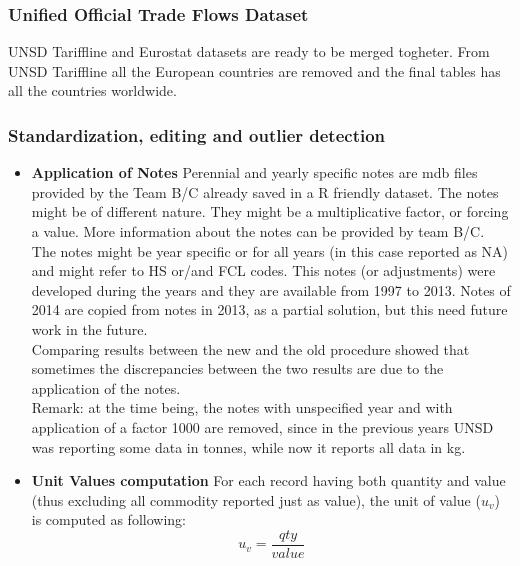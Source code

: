 \documentclass[nojss]{jss}\usepackage[]{graphicx}\usepackage[]{color}
\begin{document}
\subsubsection{Unified Official Trade Flows Dataset}
UNSD Tariffline and Eurostat datasets are ready to be merged togheter. From UNSD Tariffline all the European countries are removed and the final tables has all the countries worldwide.

\subsubsection{Standardization, editing and outlier detection}
\begin{itemize}
\item {\bf Application of Notes} Perennial and yearly specific notes are mdb files provided by the Team B/C already saved in a R friendly dataset. The notes might be of different nature. They might be a multiplicative factor, or forcing a value. More information  about the notes can be provided by team B/C. The notes might be year specific or for all years (in this case reported as NA) and might refer to HS or/and FCL codes. This notes (or adjustments) were developed during the years and they are available from 1997 to 2013. Notes of 2014 are copied from notes in 2013, as a partial solution, but this need future work in the future.\\
Comparing results between the new and the old procedure showed that sometimes the discrepancies between the two results are due to the application of the notes.\\
Remark: at the time being, the notes with unspecified year and with application of a factor 1000 are removed, since in the previous years UNSD was reporting some data in tonnes, while now it reports all data in kg.\\

\item {\bf Unit Values computation} For each record having both quantity and value (thus excluding all commodity reported just as value), the unit of value ($u_v$) is computed as following:
\begin{equation}
u_v = \frac{qty}{value}
\end{equation}


\end{itemize}
\end{document}
